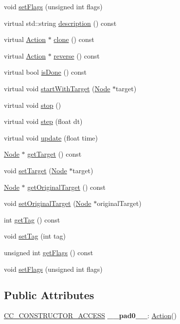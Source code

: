 \begin{DoxyCompactItemize}
void \hyperlink{classAction_a848b0f80143acd07c814735463a8e920}{set\+Flags} (unsigned int flags)
\item 
virtual std\+::string \hyperlink{classAction_a8b9906b4513652f7b5ee0efc852848d4}{description} () const
\item 
virtual \hyperlink{classAction}{Action} $\ast$ \hyperlink{classAction_a6a047ad6b3bd200b0f86c7bb519b31ea}{clone} () const
\item 
virtual \hyperlink{classAction}{Action} $\ast$ \hyperlink{classAction_a2f06b574c4f066a3f11854a77c456227}{reverse} () const
\item 
virtual bool \hyperlink{classAction_af8a1b5aea4383d37df6e2a53dad6799b}{is\+Done} () const
\item 
virtual void \hyperlink{classAction_aa082eec3cbe15a9510ec440edc684359}{start\+With\+Target} (\hyperlink{classNode}{Node} $\ast$target)
\item 
virtual void \hyperlink{classAction_a27eeea2acc524f112d78df187cb541d9}{stop} ()
\item 
virtual void \hyperlink{classAction_a86cd2041b439b7ca7bc59ce7d6e0aa12}{step} (float dt)
\item 
virtual void \hyperlink{classAction_a7ee7b996fa608239a614b8c32580c245}{update} (float time)
\item 
\hyperlink{classNode}{Node} $\ast$ \hyperlink{classAction_a696d1ef82807cc18207ba93d59d6ca16}{get\+Target} () const
\item 
void \hyperlink{classAction_abd61e00e97d9604126cf149112b877de}{set\+Target} (\hyperlink{classNode}{Node} $\ast$target)
\item 
\hyperlink{classNode}{Node} $\ast$ \hyperlink{classAction_a50cdb52f323c6756ec300e4d0f86596a}{get\+Original\+Target} () const
\item 
void \hyperlink{classAction_aa58699929e174e97a057b51e83fcc1f3}{set\+Original\+Target} (\hyperlink{classNode}{Node} $\ast$original\+Target)
\item 
int \hyperlink{classAction_a1f090a477cab2dbc8175385c66b91c31}{get\+Tag} () const
\item 
void \hyperlink{classAction_ac23487f50607b5acef33c1aa7dd9468e}{set\+Tag} (int tag)
\item 
unsigned int \hyperlink{classAction_aabe5706c0cc66d461b14558728dccf01}{get\+Flags} () const
\item 
void \hyperlink{classAction_a848b0f80143acd07c814735463a8e920}{set\+Flags} (unsigned int flags)
\end{DoxyCompactItemize}
\subsection*{Public Attributes}
\begin{DoxyCompactItemize}
\item 
\mbox{\label{classAction_a710baac1dbe39ac34dc7f3461d4a8c39}} 
\hyperlink{_2cocos2d_2cocos_2base_2ccConfig_8h_a25ef1314f97c35a2ed3d029b0ead6da0}{C\+C\+\_\+\+C\+O\+N\+S\+T\+R\+U\+C\+T\+O\+R\+\_\+\+A\+C\+C\+E\+SS} {\bfseries \+\_\+\+\_\+pad0\+\_\+\+\_\+}\+: \hyperlink{classAction}{Action}()
\end{DoxyCompactItemize}
